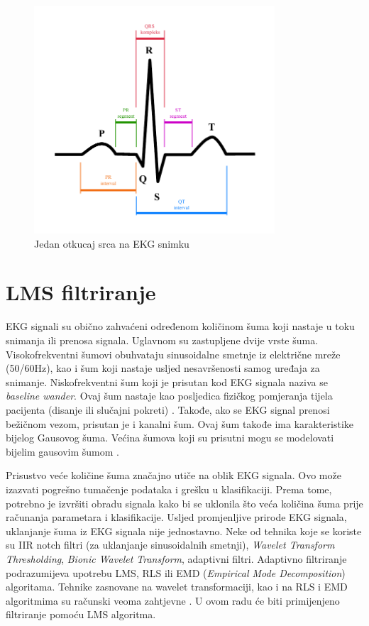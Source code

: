 \documentclass[12pt]{SeminarskiADS}
\begin{document}



\begin{figure}[h]
\centering
\includegraphics[width=0.8\textwidth]{ecg_otkucaj}
\caption{Jedan otkucaj srca na EKG snimku}
\label{ecg_otkucaj}
\end{figure}


\section{LMS filtriranje}
\label{sec:lms}

EKG signali su obično zahvaćeni određenom količinom šuma koji nastaje u toku snimanja ili prenosa signala. Uglavnom su zastupljene dvije vrste šuma. Visokofrekventni šumovi obuhvataju sinusoidalne smetnje iz električne mreže (50/60Hz), kao i šum koji nastaje usljed nesavršenosti samog uređaja za snimanje. Niskofrekventni šum koji je prisutan kod EKG signala naziva se \emph{baseline wander}. Ovaj šum nastaje kao posljedica fizičkog pomjeranja tijela pacijenta (disanje ili slučajni pokreti) \cite{ecg_denoise}. Takođe, ako se EKG signal prenosi bežičnom vezom, prisutan je i kanalni šum. Ovaj šum takođe ima karakteristike bijelog Gausovog šuma. Većina šumova koji su prisutni mogu se modelovati bijelim gausovim šumom \cite{gl}.

Prisustvo veće količine šuma značajno utiče na oblik EKG signala. Ovo može izazvati pogrešno tumačenje podataka i grešku u klasifikaciji. Prema tome, potrebno je izvršiti obradu signala kako bi se uklonila što veća količina šuma prije računanja parametara i klasifikacije. Usljed promjenljive prirode EKG signala, uklanjanje šuma iz EKG signala nije jednostavno. Neke od tehnika koje se koriste su IIR notch filtri (za uklanjanje sinusoidalnih smetnji), \emph{Wavelet Transform Thresholding}, \emph{Bionic Wavelet Transform}, adaptivni filtri. Adaptivno filtriranje podrazumijeva upotrebu LMS, RLS ili EMD (\emph{Empirical Mode Decomposition}) algoritama. Tehnike zasnovane na wavelet transformaciji, kao i na RLS i EMD algoritmima su računski veoma zahtjevne \cite{gl}. U ovom radu će biti primijenjeno filtriranje pomoću LMS algoritma.
\end{document}
